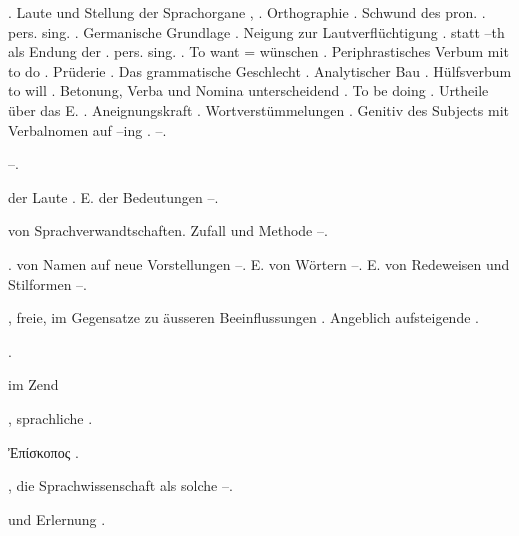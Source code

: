 \begin{register}
. Laute und Stellung der Sprachorgane \pageref{sp.34}, \pageref{sp.36}. Orthographie \pageref{sp.133}. Schwund des pron. \pageref{sp.2}. pers. sing. \pageref{sp.152}. Germanische Grundlage \pageref{sp.158}. Neigung zur Lautverflüchtigung \pageref{sp.207}.  statt –th als Endung der \pageref{sp.3}. pers. sing. \pageref{sp.213}. To want = wünschen \pageref{sp.222}. Periphrastisches Verbum mit to do \pageref{sp.239}. Prüderie \pageref{sp.249}. Das grammatische Geschlecht \pageref{sp.254}. Analytischer Bau \pageref{sp.257}. Hülfsverbum to will \pageref{sp.316}.  Betonung, Verba und Nomina unterscheidend \pageref{sp.379}. To be doing \pageref{sp.384}. Urtheile über das E. \pageref{sp.393}. Aneignungskraft \pageref{sp.429}.  Wortverstümmelungen \pageref{sp.433}. Genitiv des Subjects mit Verbalnomen auf –ing \pageref{sp.467}.  \pageref{sp.474}–\pageref{sp.475}.

 \pageref{sp.348}–\pageref{sp.349}.

 der Laute \pageref{sp.200}. E. der Bedeutungen \pageref{sp.238}–\pageref{sp.239}.

 von Sprachverwandtschaften. Zufall und Methode \pageref{sp.144}–\pageref{sp.145}.

.  von Namen auf neue Vorstellungen \pageref{sp.40}–\pageref{sp.43}.  E. von Wörtern \pageref{sp.262}–\pageref{sp.268}. E. von Redeweisen und Stilformen \pageref{sp.270}–\pageref{sp.273}.

,  freie, im Gegensatze zu äusseren Beeinflussungen \pageref{sp.178}. Angeblich aufsteigende \pageref{sp.415}.

 \sed{\pageref{sp.28},} \pageref{sp.74}.

 im Zend \pageref{sp.199}

, sprachliche \pageref{sp.274}.

Ἐπίσκοπος \pageref{sp.231}.

, die Sprach\-wissenschaft als solche \pageref{sp.10}–\pageref{sp.11}.

 und Erlernung \pageref{sp.75}.


\end{register}

